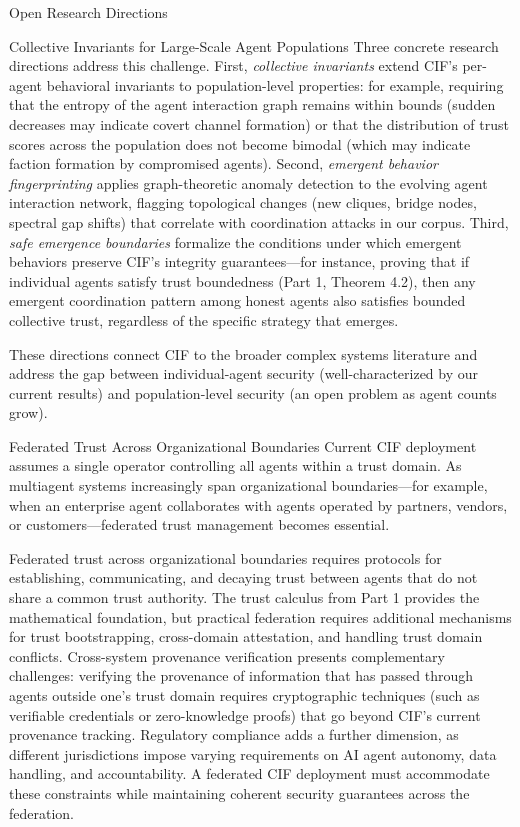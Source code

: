 \documentclass[
  ignorenonframetext,
]{beamer}
\begin{document}
\begin{frame}{Open Research Directions}
\begin{block}{Collective Invariants for Large-Scale Agent Populations}
Three concrete research directions address this challenge. First,
\emph{collective invariants} extend CIF's per-agent behavioral
invariants to population-level properties: for example, requiring that
the entropy of the agent interaction graph remains within bounds (sudden
decreases may indicate covert channel formation) or that the
distribution of trust scores across the population does not become
bimodal (which may indicate faction formation by compromised agents).
Second, \emph{emergent behavior fingerprinting} applies graph-theoretic
anomaly detection to the evolving agent interaction network, flagging
topological changes (new cliques, bridge nodes, spectral gap shifts)
that correlate with coordination attacks in our corpus. Third,
\emph{safe emergence boundaries} formalize the conditions under which
emergent behaviors preserve CIF's integrity guarantees---for instance,
proving that if individual agents satisfy trust boundedness (Part 1,
Theorem 4.2), then any emergent coordination pattern among honest agents
also satisfies bounded collective trust, regardless of the specific
strategy that emerges.

These directions connect CIF to the broader complex systems literature
and address the gap between individual-agent security
(well-characterized by our current results) and population-level
security (an open problem as agent counts grow).
\end{block}

\begin{block}{Federated Trust Across Organizational Boundaries}
\protect{}\label{federated-trust-across-organizational-boundaries}
Current CIF deployment assumes a single operator controlling all agents
within a trust domain. As multiagent systems increasingly span
organizational boundaries---for example, when an enterprise agent
collaborates with agents operated by partners, vendors, or
customers---federated trust management becomes essential.

Federated trust across organizational boundaries requires protocols for
establishing, communicating, and decaying trust between agents that do
not share a common trust authority. The trust calculus from Part 1
provides the mathematical foundation, but practical federation requires
additional mechanisms for trust bootstrapping, cross-domain attestation,
and handling trust domain conflicts. Cross-system provenance
verification presents complementary challenges: verifying the provenance
of information that has passed through agents outside one's trust domain
requires cryptographic techniques (such as verifiable credentials or
zero-knowledge proofs) that go beyond CIF's current provenance tracking.
Regulatory compliance adds a further dimension, as different
jurisdictions impose varying requirements on AI agent autonomy, data
handling, and accountability. A federated CIF deployment must
accommodate these constraints while maintaining coherent security
guarantees across the federation.
\end{block}
\end{frame}
\end{document}
